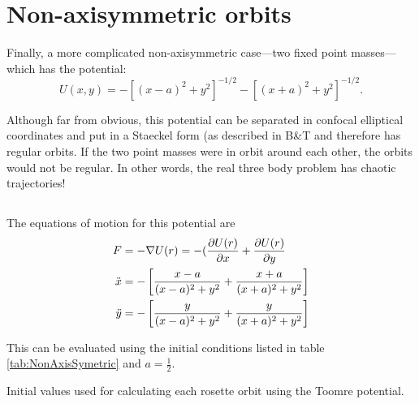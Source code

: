 \section{Non-axisymmetric orbits}

Finally, a more complicated non-axisymmetric case—two fixed point
masses—which has the potential:
\begin{equation}
    U(x,y) = -[(x-a)^2 +y^2]^{-1/2} -[(x+a)^2 +y^2]^{-1/2}.
\end{equation}

Although far from obvious, this potential can be separated in confocal
elliptical coordinates and put in a Staeckel form (as described in B\&T
and therefore has regular orbits. If the two point masses were in orbit
around each other, the orbits would not be regular. In other words, the
real three body problem has chaotic trajectories!
\subsection{}

The equations of motion for this potential are
\begin{align*}
    F&=-\nabla U(r) =-(\frac{\partial U(r)}{\partial x}+\frac{\partial U(r)}{\partial y}\\
    \Ddot{x}&=-\left[\frac{x-a}{(x-a)^2+y^2}+\frac{x+a}{(x+a)^2+y^2}\right] \\
    \Ddot{y}&=- \left[\frac{y}{(x-a)^2+y^2}+\frac{y}{(x+a)^2+y^2}\right]
\end{align*}

This can be evaluated using the initial conditions listed in table \ref{tab:NonAxisSymetric} and $a= \frac{1}{2}$.

\begin{table}
  \begin{center}
    \caption{Initial values used for calculating each rosette orbit using the Toomre potential.}
    \label{tab:NonAxisSymetric}
  \end{center}
\end{table}



